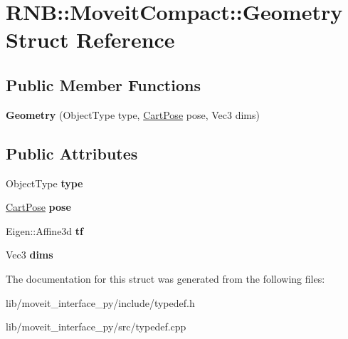 \hypertarget{struct_r_n_b_1_1_moveit_compact_1_1_geometry}{}\section{R\+NB\+:\+:Moveit\+Compact\+:\+:Geometry Struct Reference}
\label{struct_r_n_b_1_1_moveit_compact_1_1_geometry}
\subsection*{Public Member Functions}
\begin{DoxyCompactItemize}
\item 
\mbox{\label{struct_r_n_b_1_1_moveit_compact_1_1_geometry_a07abe1e7f997e8912e3613e2b79e7068}} 
{\bfseries Geometry} (Object\+Type type, \hyperlink{class_r_n_b_1_1_moveit_compact_1_1_cart_pose}{Cart\+Pose} pose, Vec3 dims)
\end{DoxyCompactItemize}
\subsection*{Public Attributes}
\begin{DoxyCompactItemize}
\item 
\mbox{\label{struct_r_n_b_1_1_moveit_compact_1_1_geometry_a5ee020f2993ae6acf09e0541f18ad7e0}} 
Object\+Type {\bfseries type}
\item 
\mbox{\label{struct_r_n_b_1_1_moveit_compact_1_1_geometry_ad99395fb436817cb0b5d9a38239937be}} 
\hyperlink{class_r_n_b_1_1_moveit_compact_1_1_cart_pose}{Cart\+Pose} {\bfseries pose}
\item 
\mbox{\label{struct_r_n_b_1_1_moveit_compact_1_1_geometry_a35f7947bd2a158e7741f6f03962fddc2}} 
Eigen\+::\+Affine3d {\bfseries tf}
\item 
\mbox{\label{struct_r_n_b_1_1_moveit_compact_1_1_geometry_a0d6dc8756e3a2597eb7d2d4c25e74cc7}} 
Vec3 {\bfseries dims}
\end{DoxyCompactItemize}


The documentation for this struct was generated from the following files\+:\begin{DoxyCompactItemize}
\item 
lib/moveit\+\_\+interface\+\_\+py/include/typedef.\+h\item 
lib/moveit\+\_\+interface\+\_\+py/src/typedef.\+cpp\end{DoxyCompactItemize}
